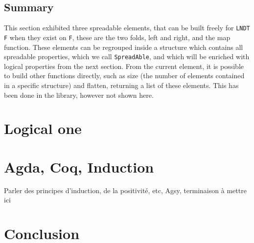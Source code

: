 \documentclass[a4paper,UKenglish,cleveref, autoref, thm-restate]{lipics}
\begin{document}
\foldsexamples

\subsection{Summary}\label{ssec:computationalsummary}

This section exhibited three spreadable elements, that can be built freely for \texttt{LNDT F} when they exist on \texttt{F}, these are the two folds, left and right, and the map function. These elements can be regrouped inside a structure which contains all spreadable properties, which we call \texttt{SpreadAble}, and which will be enriched with logical properties from the next section. From the current element, it is possible to build other functions directly, such as size (the number of elements contained in a specific structure) and flatten, returning a list of these elements. This has been done in the library, however not shown here.

\section{Logical one}\label{sec:logical}

\section{Agda, Coq, Induction}

Parler des principes d'induction, de la positivité, etc, Agsy, terminaison à mettre ici

\section{Conclusion}\label{sec:conclusion}


\end{document}
